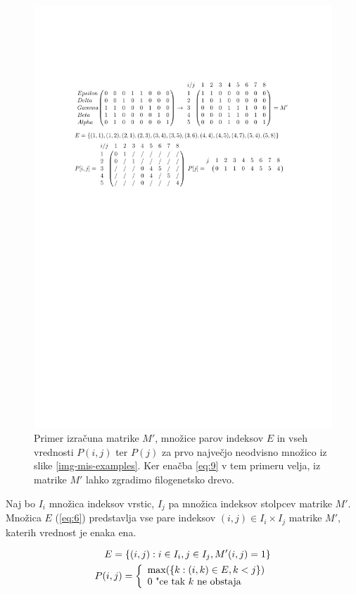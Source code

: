 \documentclass[a4paper, 12pt]{book}
\begin{document}
\begin{figure}
	\begin{center}
		\includegraphics[scale=0.8, clip=true, trim=2.9cm 17cm 3cm 5cm]{gfx/tree_reconstruction_m.pdf}
	\end{center}
	\caption{Primer izračuna matrike $M'$, množice parov indeksov $E$ in vseh vrednosti $P(i, j)$ ter $P(j)$ za prvo največjo neodvisno množico iz slike \ref{img-mis-examples}. Ker enačba \ref{eq:9} v tem primeru velja, iz matrike $M'$ lahko zgradimo filogenetsko drevo.}
	\label{img-reconstruct-m}
\end{figure}

Naj bo $I_i$ množica indeksov vrstic, $I_j$ pa množica indeksov stolpcev matrike $M'$. Množica $E$ (\ref{eq:6}) predstavlja vse pare indeksov $(i, j) \in I_i \times I_j$ matrike $M'$, katerih vrednost je enaka ena.

\begin{align}
	E = \left\{ {(i, j): i \in I_i, j \in I_j, M'(i, j) = 1} \right\} \label{eq:6} \\
	P(i, j) = 
		\left\{
		\begin{array}{ll}
			\max(\left\{k: (i, k) \in E, k < j\right\}) \\
			0 $      "ce tak $k$ ne obstaja$
		\end{array}
		\right.
	\label{eq:7}
\end{align}
\end{document}
